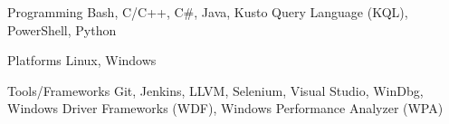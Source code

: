 
\begin{cvskills}

  \cvskill
    {Programming} %
    {
      Bash,
      C/C++,
      C\#,
      Java,
      Kusto Query Language (KQL),
      PowerShell,
      Python
    } %

  \cvskill
    {Platforms} %
    {
      Linux,
      Windows
    } %

  \cvskill
    {Tools/Frameworks} %
    {
      Git,
      Jenkins,
      LLVM,
      Selenium,
      Visual Studio,
      WinDbg,
      Windows Driver Frameworks (WDF),
      Windows Performance Analyzer (WPA)
    } %

\end{cvskills}
